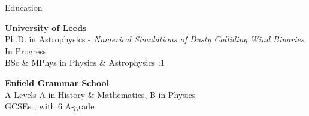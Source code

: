 \documentclass{resume} %
\begin{document}

\begin{rSection}{Education}

{\bf University of Leeds}  \\ 
Ph.D. in Astrophysics - {\em Numerical Simulations of Dusty Colliding Wind Binaries} \dotfill In Progress \\
BSc \& MPhys in Physics \& Astrophysics :1

{\bf Enfield Grammar School}  \\
A-Levels \dotfill A in History \& Mathematics, B in Physics \\
GCSEs , with 6 A-grade

\end{rSection}

\end{document}
